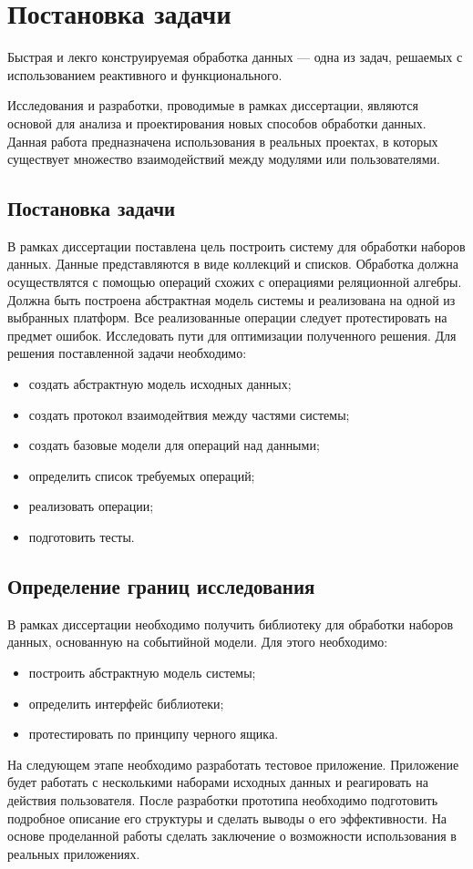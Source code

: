\section{Постановка задачи}
\label{sec:practice:planning}

Быстрая и лекго конструируемая обработка данных --- одна из задач, решаемых с использованием реактивного и функционального.

Исследования и разработки, проводимые в рамках диссертации, являются основой для анализа и проектирования новых способов обработки данных.
Данная работа предназначена использования в реальных проектах, в которых существует множество взаимодействий между модулями или пользователями.

\subsection{Постановка задачи}
\label{sub:practice:task_planning}

В рамках диссертации поставлена цель построить систему для обработки наборов данных.
Данные представляются в виде коллекций и списков.
Обработка должна осуществлятся с помощью операций схожих с операциями реляционной алгебры.
Должна быть построена абстрактная модель системы и реализована на одной из выбранных платформ.
Все реализованные операции следует протестировать на предмет ошибок.
Исследовать пути для оптимизации полученного решения.
Для решения поставленной задачи необходимо:
\begin{itemize}
  \item создать абстрактную модель исходных данных;
  \item создать протокол взаимодейтвия между частями системы;
  \item создать базовые модели для операций над данными;
  \item	определить список требуемых операций;
  \item	реализовать операции;
  \item	подготовить тесты.
\end{itemize}

\subsection{Определение границ исследования}
\label{sub:practice:task_milestone}

В рамках диссертации необходимо получить библиотеку для обработки наборов данных, основанную на событийной модели.
Для этого необходимо:
\begin{itemize}
  \item построить абстрактную модель системы;
  \item определить интерфейс библиотеки;
  \item протестировать по принципу черного ящика.
\end{itemize}

На следующем этапе необходимо разработать тестовое приложение.
Приложение будет работать с несколькими наборами исходных данных и реагировать на действия пользователя.
После разработки прототипа необходимо подготовить подробное описание его структуры и сделать выводы о его эффективности.
На основе проделанной работы сделать заключение о возможности использования в реальных приложениях.
